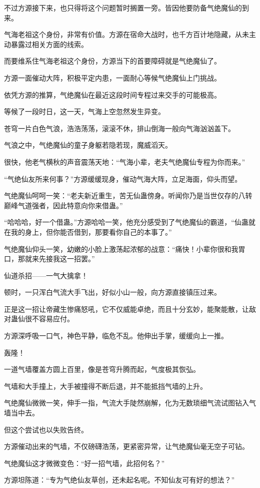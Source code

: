\begin{this_body}
不过方源接下来，也只得将这个问题暂时搁置一旁。皆因他要防备气绝魔仙的到来。

气海老祖这个身份，非常有价值。方源在宿命大战时，也千方百计地隐藏，从未主动暴露过相关方面的线索。

而要维系住气海老祖这个身份，方源当下的首要障碍就是气绝魔仙了。

方源一面催动大阵，积极平定内患，一面耐心等候气绝魔仙上门挑战。

依凭方源的推算，气绝魔仙在最近这段时间专程过来交手的可能极高。

等候了一段时日，这一天，气海上空忽然发生异变。

苍穹一片白色气浪，浩浩荡荡，滚滚不休，排山倒海一般向气海汹汹盖下。

气浪之中，气绝魔仙的童子身躯若隐若现，魔威滔天。

很快，他老气横秋的声音震荡天地：“气海小辈，老夫气绝魔仙专程为你而来。”

“气绝仙友所来何事？”方源缓缓现身，催动气海大阵，立足海面，仰头而望。

气绝魔仙呵呵一笑：“老夫新近重生，苦无仙蛊傍身。听闻你乃是当世仅存的八转巅峰气道强者，因此特意向你来借蛊。”

“哈哈哈，好一个借蛊。”方源哈哈一笑，他充分感受到了气绝魔仙的霸道，“仙蛊就在我的身上，但你能否借到，那要看你自己的本事了。”

气绝魔仙仰头一笑，幼嫩的小脸上激荡起浓郁的战意：“痛快！小辈你很和我胃口，那就来先接我这一招罢。”

仙道杀招——一气大擒拿！

顿时，一只浑白气流大手飞出，好似小山一般，向方源直接镇压过来。

正是这一招让帝藏生惨痛怒吼，它不仅威能卓绝，而且十分玄妙，能聚能散，让敌对蛊仙很不容易应付。

方源深呼吸一口气，神色平静，临危不乱。他伸出手掌，缓缓向上一推。

轰隆！

一道气墙覆盖方圆上百里，像是苍穹升腾而起，气度极其恢弘。

气墙和大手撞上，大手被撞得不断后退，并不能抵挡气墙的上升。

气绝魔仙微微一笑，伸手一指，气流大手陡然崩解，化为无数琐细气流试图钻入气墙当中去。

但这个尝试也以失败告终。

方源催动出来的气墙，不仅磅礴浩荡，更紧密异常，让气绝魔仙毫无空子可钻。

气绝魔仙这才微微变色：“好一招气墙，此招何名？”

方源坦陈道：“专为气绝仙友草创，还未起名呢。不知仙友可有好的想法？”


\end{this_body}

